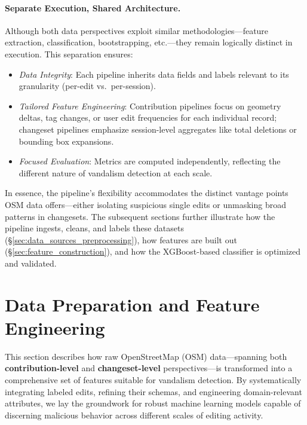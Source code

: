 \documentclass[
    13pt, %
    a4paper, %
    listof=totoc, %
    bibliography=totoc, %
    index=totoc, %
    headsepline
]{scrreprt}
\begin{document}
\paragraph{Separate Execution, Shared Architecture.}
Although both data perspectives exploit similar methodologies—feature extraction, classification, bootstrapping, etc.—they remain logically distinct in execution. This separation ensures:
\begin{itemize}
    \item \textit{Data Integrity}: Each pipeline inherits data fields and labels relevant to its granularity (per-edit vs.\ per-session).
    \item \textit{Tailored Feature Engineering}: Contribution pipelines focus on geometry deltas, tag changes, or user edit frequencies for each individual record; changeset pipelines emphasize session-level aggregates like total deletions or bounding box expansions.
    \item \textit{Focused Evaluation}: Metrics are computed independently, reflecting the different nature of vandalism detection at each scale.
\end{itemize}

\noindent
In essence, the pipeline’s flexibility accommodates the distinct vantage points OSM data offers—either isolating suspicious single edits or unmasking broad patterns in changesets. The subsequent sections further illustrate how the pipeline ingests, cleans, and labels these datasets (\S\ref{sec:data_sources_preprocessing}), how features are built out (\S\ref{sec:feature_construction}), and how the XGBoost-based classifier is optimized and validated.


\vspace{1em}

\section{Data Preparation and Feature Engineering}
\label{sec:data_preparation}

This section describes how raw OpenStreetMap (OSM) data—spanning both \textbf{contribution-level} and \textbf{changeset-level} perspectives—is transformed into a comprehensive set of features suitable for vandalism detection. By systematically integrating labeled edits, refining their schemas, and engineering domain-relevant attributes, we lay the groundwork for robust machine learning models capable of discerning malicious behavior across different scales of editing activity.
\end{document}
